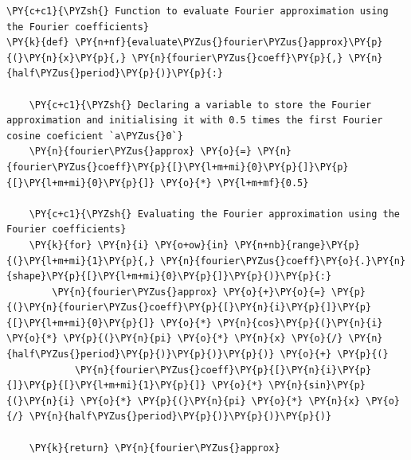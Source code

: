     \begin{tcolorbox}[breakable, size=fbox, boxrule=1pt, pad at break*=1mm,colback=cellbackground, colframe=cellborder]
\begin{Verbatim}[commandchars=\\\{\}]
\PY{c+c1}{\PYZsh{} Function to evaluate Fourier approximation using the Fourier coefficients}
\PY{k}{def} \PY{n+nf}{evaluate\PYZus{}fourier\PYZus{}approx}\PY{p}{(}\PY{n}{x}\PY{p}{,} \PY{n}{fourier\PYZus{}coeff}\PY{p}{,} \PY{n}{half\PYZus{}period}\PY{p}{)}\PY{p}{:}

    \PY{c+c1}{\PYZsh{} Declaring a variable to store the Fourier approximation and initialising it with 0.5 times the first Fourier cosine coeficient `a\PYZus{}0`}
    \PY{n}{fourier\PYZus{}approx} \PY{o}{=} \PY{n}{fourier\PYZus{}coeff}\PY{p}{[}\PY{l+m+mi}{0}\PY{p}{]}\PY{p}{[}\PY{l+m+mi}{0}\PY{p}{]} \PY{o}{*} \PY{l+m+mf}{0.5}

    \PY{c+c1}{\PYZsh{} Evaluating the Fourier approximation using the Fourier coefficients}
    \PY{k}{for} \PY{n}{i} \PY{o+ow}{in} \PY{n+nb}{range}\PY{p}{(}\PY{l+m+mi}{1}\PY{p}{,} \PY{n}{fourier\PYZus{}coeff}\PY{o}{.}\PY{n}{shape}\PY{p}{[}\PY{l+m+mi}{0}\PY{p}{]}\PY{p}{)}\PY{p}{:}
        \PY{n}{fourier\PYZus{}approx} \PY{o}{+}\PY{o}{=} \PY{p}{(}\PY{n}{fourier\PYZus{}coeff}\PY{p}{[}\PY{n}{i}\PY{p}{]}\PY{p}{[}\PY{l+m+mi}{0}\PY{p}{]} \PY{o}{*} \PY{n}{cos}\PY{p}{(}\PY{n}{i} \PY{o}{*} \PY{p}{(}\PY{n}{pi} \PY{o}{*} \PY{n}{x} \PY{o}{/} \PY{n}{half\PYZus{}period}\PY{p}{)}\PY{p}{)}\PY{p}{)} \PY{o}{+} \PY{p}{(}
            \PY{n}{fourier\PYZus{}coeff}\PY{p}{[}\PY{n}{i}\PY{p}{]}\PY{p}{[}\PY{l+m+mi}{1}\PY{p}{]} \PY{o}{*} \PY{n}{sin}\PY{p}{(}\PY{n}{i} \PY{o}{*} \PY{p}{(}\PY{n}{pi} \PY{o}{*} \PY{n}{x} \PY{o}{/} \PY{n}{half\PYZus{}period}\PY{p}{)}\PY{p}{)}\PY{p}{)}

    \PY{k}{return} \PY{n}{fourier\PYZus{}approx}
\end{Verbatim}
\end{tcolorbox}

